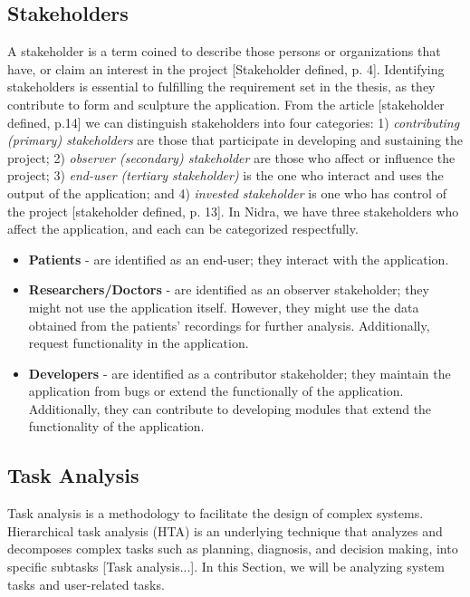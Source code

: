 \subsection{Stakeholders}
A stakeholder is a term coined to describe those persons or organizations that have, or claim an interest in the project [Stakeholder defined, p. 4].  Identifying stakeholders is essential to fulfilling the requirement set in the thesis, as they contribute to form and sculpture the application. From the article [stakeholder defined, p.14] we can distinguish stakeholders into four categories: 1) \textit{contributing (primary) stakeholders} are those that participate in developing and sustaining the project; 2) \textit{observer (secondary) stakeholder} are those who affect or influence the project;  3) \textit{end-user (tertiary stakeholder)} is the one who interact and uses the output of the application; and 4) \textit{invested stakeholder} is one who has control of the project  [stakeholder defined, p. 13]. In Nidra, we have three stakeholders who affect the application, and each can be categorized respectfully.
\begin{itemize}
    \item \textbf{Patients} - are identified as an end-user; they interact with the application.  
    \item \textbf{Researchers/Doctors} - are identified as an observer stakeholder; they might not use the application itself. However, they might use the data obtained from the patients' recordings for further analysis. Additionally, request functionality in the application.
    \item \textbf{Developers} - are identified as a contributor stakeholder; they maintain the application from bugs or extend the functionally of the application. Additionally, they can contribute to developing modules that extend the functionality of the application. 
\end{itemize}


\subsection{Task Analysis}
Task analysis is a methodology to facilitate the design of complex systems. Hierarchical task analysis (HTA) is an underlying technique that analyzes and decomposes complex tasks such as planning, diagnosis, and decision making, into specific subtasks [Task analysis...]. In this Section, we will be analyzing system tasks and user-related tasks.

